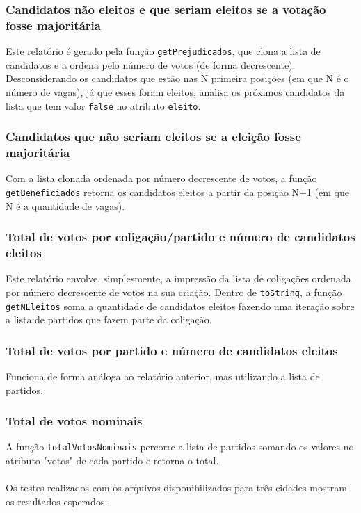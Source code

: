\documentclass[12pt,a4paper]{article}
\begin{document}
\subsubsection*{Candidatos não eleitos e que seriam eleitos se a votação fosse majoritária}
Este relatório é gerado pela função \texttt{getPrejudicados}, que clona a lista de candidatos e a ordena pelo número de votos (de forma decrescente). Desconsiderando os candidatos que estão nas N primeira posições (em que N é o número de vagas), já que esses foram eleitos, analisa os próximos candidatos da lista que tem valor \texttt{false} no atributo \texttt{eleito}.


\subsubsection*{Candidatos que não seriam eleitos se a eleição fosse majoritária}
Com a lista clonada ordenada por número decrescente de votos, a função \texttt{getBeneficiados} retorna os candidatos eleitos a partir da posição N+1 (em que N é a quantidade de vagas).

\subsubsection*{Total de votos por coligação/partido e número de candidatos eleitos}
Este relatório envolve, simplesmente, a impressão da lista de coligações ordenada por número decrescente de votos na sua criação. Dentro de \texttt{toString}, a função \texttt{getNEleitos} soma a quantidade de candidatos eleitos fazendo uma iteração sobre a lista de partidos que fazem parte da coligação.

\subsubsection*{Total de votos por partido e número de candidatos eleitos}
Funciona de forma análoga ao relatório anterior, mas utilizando a lista de partidos.

\subsubsection*{Total de votos nominais}
A função \texttt{totalVotosNominais} percorre a lista de partidos somando os valores no atributo "votos" de cada partido e retorna o total.\\

\\Os testes realizados com os arquivos disponibilizados para três cidades mostram os resultados esperados.\\
\end{document}

